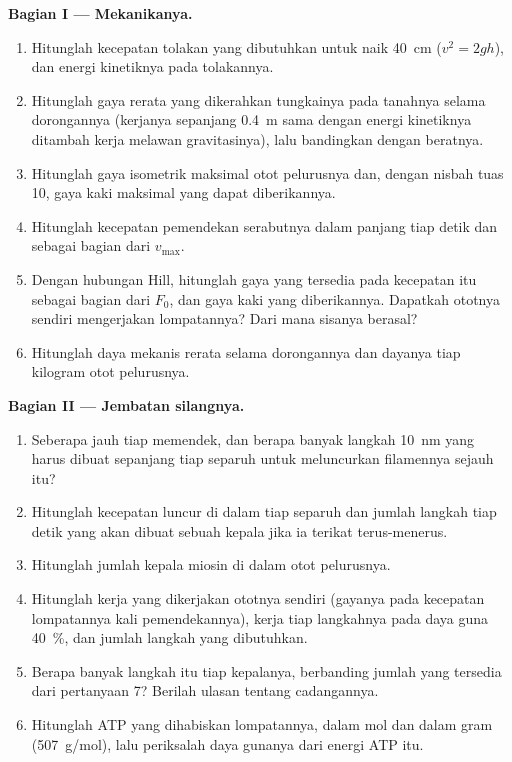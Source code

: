 \begin{problem}
\medskip
\noindent\textbf{Bagian I --- Mekanikanya.}
\begin{enumerate}
  \item Hitunglah kecepatan tolakan yang dibutuhkan untuk naik
        \qty{40}{cm} ($v^{2} = 2gh$), dan energi kinetiknya pada
        tolakannya.
  \item Hitunglah gaya rerata yang dikerahkan tungkainya pada tanahnya
        selama dorongannya (kerjanya sepanjang \qty{0.4}{m} sama dengan
        energi kinetiknya ditambah kerja melawan gravitasinya), lalu
        bandingkan dengan beratnya.
  \item Hitunglah gaya isometrik maksimal otot pelurusnya dan, dengan
        nisbah tuas 10, gaya kaki maksimal yang dapat diberikannya.
  \item Hitunglah kecepatan pemendekan serabutnya dalam panjang tiap
        detik dan sebagai bagian dari $v_{\max}$.
  \item Dengan hubungan Hill, hitunglah gaya yang tersedia pada
        kecepatan itu sebagai bagian dari $F_0$, dan gaya kaki yang
        diberikannya. Dapatkah ototnya sendiri mengerjakan lompatannya?
        Dari mana sisanya berasal?
  \item Hitunglah daya mekanis rerata selama dorongannya dan dayanya
        tiap kilogram otot pelurusnya.
\end{enumerate}

\medskip
\noindent\textbf{Bagian II --- Jembatan silangnya.}
\begin{enumerate}[resume]
  \item Seberapa jauh tiap  memendek, dan berapa banyak
        langkah \qty{10}{nm} yang harus dibuat sepanjang tiap separuh
         untuk meluncurkan filamennya sejauh itu?
  \item Hitunglah kecepatan luncur di dalam tiap separuh 
        dan jumlah langkah tiap detik yang akan dibuat sebuah kepala
        jika ia terikat terus-menerus.
  \item Hitunglah jumlah kepala miosin di dalam otot pelurusnya.
  \item Hitunglah kerja yang dikerjakan ototnya sendiri (gayanya pada
        kecepatan lompatannya kali pemendekannya), kerja tiap langkahnya
        pada daya guna \qty{40}{\%}, dan jumlah langkah yang dibutuhkan.
  \item Berapa banyak langkah itu tiap kepalanya, berbanding jumlah
        yang tersedia dari pertanyaan 7? Berilah ulasan tentang
        cadangannya.
  \item Hitunglah ATP yang dihabiskan lompatannya, dalam mol dan dalam
        gram (\qty{507}{g/mol}), lalu periksalah daya gunanya dari
        energi ATP itu.
\end{enumerate}


\end{problem}
